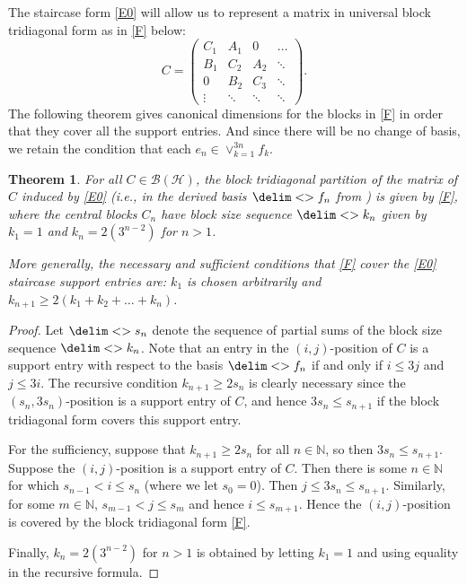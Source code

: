 \documentclass[10pt,reqno]{amsart}
\newtheorem{theorem}{Theorem}[section]
\theoremstyle{remark}
\newcommand{\BH}{\mathcal{B}(\Hil)}
\newcommand{\Hil}{\mathcal{H}}
\newcommand{\seq}{\delim<>}
\numberwithin{equation}{section}
\begin{document}
The staircase form \eqref{E0} will allow us to represent a matrix in universal block tridiagonal form as in \eqref{F} below:
\begin{equation}
  \label{F}
  C =
  \begin{pmatrix}
    C_1 &  A_1  &0  &\dots          \\
    B_1 & C_2&A_2   &\ddots           \\
    0 &B_2 &C_3 &\ddots            \\
    \vdots &\ddots &\ddots  &\ddots
  \end{pmatrix}.
\end{equation}
The following theorem gives canonical dimensions for the blocks in \eqref{F} in order that they cover all the support entries.
And since there will be no change of basis, we retain the  condition that each $e_n\in \vee_{k=1}^{3n} f_k$.

\begin{theorem}
  \label{T1}
  For all $C \in \BH$, the block tridiagonal partition of the matrix of $C$ induced by \eqref{E0} (i.e.,  in the derived basis $\seq{f_n}$ from ) is given by \eqref{F},
  where the central blocks $C_n$ have block size sequence $\seq{k_n}$ given by $k_1 = 1$ and $k_n = 2(3^{n-2})$ for $n > 1$.

  More generally, the necessary and sufficient conditions that \eqref{F} cover the \eqref{E0} staircase support entries are: $k_1$ is chosen arbitrarily and $k_{n+1} \ge 2 ( k_1 + k_2 + \dots + k_n )$.
\end{theorem}

\begin{proof}
  Let $\seq{s_n}$ denote the sequence of partial sums of the block size sequence $\seq{k_n}$.
  Note that an entry in the $(i,j)$-position of $C$ is a support entry with respect to the basis $\seq{f_n}$ if and only if $i \le 3j$ and $j \le 3i$.
  The recursive condition $k_{n+1} \ge 2 s_n$ is clearly necessary since the $(s_n,3s_n)$-position is a support entry of $C$, and hence $3s_n \le s_{n+1}$ if the block tridiagonal form covers this support entry.

  For the sufficiency, suppose that $k_{n+1} \ge 2s_n$ for all $n \in \mathbb{N}$, so then $3s_n \le s_{n+1}$.
  Suppose the $(i,j)$-position is a support entry of $C$.
  Then there is some $n \in \mathbb{N}$ for which $s_{n-1} < i \le s_n$ (where we let $s_0 = 0$).
  Then $j \le 3 s_n \le s_{n+1}$.
  Similarly, for some $m \in \mathbb{N}$, $s_{m-1} < j \le s_m$ and hence $i \le s_{m+1}$.
  Hence the $(i,j)$-position is covered by the block tridiagonal form \eqref{F}.

  Finally, $k_n = 2(3^{n-2})$ for $n > 1$ is obtained by letting $k_1 = 1$ and using equality in the recursive formula.
\end{proof}
\end{document}
